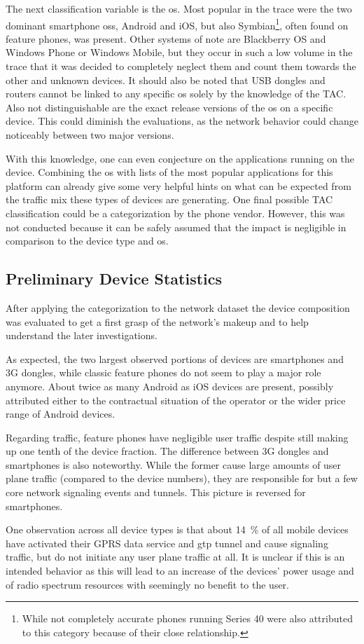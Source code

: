 The next classification variable is the \gls{os}. Most popular in the trace were the two dominant smartphone \glspl{os}, Android and iOS, but also Symbian\footnote{While not completely accurate phones running Series 40 were also attributed to this category because of their close relationship.}, often found on feature phones, was present. Other systems of note are Blackberry OS and Windows Phone or Windows Mobile, but they occur in such a low volume in the trace that it was decided to completely neglect them and count them towards the other and unknown devices. It should also be noted that USB dongles and routers cannot be linked to any specific \gls{os} solely by the knowledge of the \gls{TAC}. Also not distinguishable are the exact release versions of the \gls{os} on a specific device. This could diminish the evaluations, as the network behavior could change noticeably between two major versions.

With this knowledge, one can even conjecture on the applications running on the device. Combining the \gls{os} with lists of the most popular applications for this platform can already give some very helpful hints on what can be expected from the traffic mix these types of devices are generating. One final possible \gls{TAC} classification could be a categorization by the phone vendor. However, this was not conducted because it can be safely assumed that the impact is negligible in comparison to the device type and \gls{os}.


\subsection{Preliminary Device Statistics}

After applying the categorization to the network dataset the device composition was evaluated to get a first grasp of the network's makeup and to help understand the later investigations.

As expected, the two largest observed portions of devices are smartphones and \gls{3G} dongles, while classic feature phones do not seem to play a major role anymore. About twice as many Android as iOS devices are present, possibly attributed either to the contractual situation of the operator or the wider price range of Android devices.

Regarding traffic, feature phones have negligible user traffic despite still making up one tenth of the device fraction. The difference between \gls{3G} dongles and smartphones is also noteworthy. While the former cause large amounts of user plane traffic (compared to the device numbers), they are responsible for but a few core network signaling events and tunnels. This picture is reversed for smartphones.

One observation across all device types is that about \SI{14}{\percent} of all mobile devices have activated their \gls{GPRS} data service and \gls{gtp} tunnel and cause signaling traffic, but do not initiate any user plane traffic at all. It is unclear if this is an intended behavior as this will lead to an increase of the devices' power usage and of radio spectrum resources with seemingly no benefit to the user.